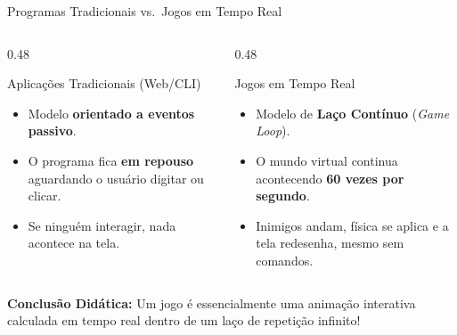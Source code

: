 \begin{frame}{Programas Tradicionais vs.\ Jogos em Tempo Real}
    \begin{columns}
        \begin{column}{0.48\textwidth}
            \begin{block}{Aplicações Tradicionais (Web/CLI)}
                \begin{itemize}
                    \item Modelo \textbf{orientado a eventos passivo}.
                    \item O programa fica \textbf{em repouso} aguardando o usuário digitar ou clicar.
                    \item Se ninguém interagir, nada acontece na tela.
                \end{itemize}
            \end{block}
        \end{column}
        \begin{column}{0.48\textwidth}
            \begin{block}{Jogos em Tempo Real}
                \begin{itemize}
                    \item Modelo de \textbf{Laço Contínuo} (\textit{Game Loop}).
                    \item O mundo virtual continua acontecendo \textbf{60 vezes por segundo}.
                    \item Inimigos andam, física se aplica e a tela redesenha, mesmo sem comandos.
                \end{itemize}
            \end{block}
        \end{column}
    \end{columns}

    \vspace{0.4cm}
    \begin{center}
        \textbf{Conclusão Didática:} Um jogo é essencialmente uma animação interativa calculada em tempo real dentro de um laço de repetição infinito!
    \end{center}
\end{frame}
